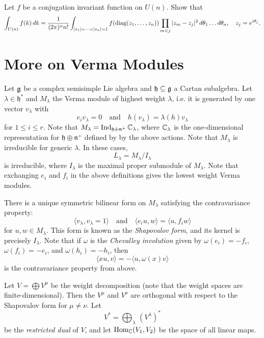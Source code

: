 \begin{exercise}
  Let $f$ be a conjugation invariant
  function on $U(n)$. Show that
  \[
    \int_{U(n)} f(k)\, dk
    = \frac{1}{(2\pi)^n n!}
    \int_{|z_1| = \cdots = |z_n| = 1}
    f(\operatorname{diag}(z_1, \dots, z_n))
    \prod_{m < j} |z_m - z_j|^2\, d\theta_1 \ldots d\theta_n,
    \quad z_j = e^{i \theta_j}.
  \]
\end{exercise}

\section{More on Verma Modules}

\begin{remark}
  Let $\mathfrak{g}$ be a complex semisimple Lie
  algebra and $\mathfrak{h} \subseteq \mathfrak{g}$ a Cartan
  subalgebra. Let $\lambda \in \mathfrak{h}^*$
  and $M_\lambda$ the Verma module of
  highest weight $\lambda$, i.e. it is
  generated by one vector $v_\lambda$ with
  \[
    e_i v_\lambda = 0 \quad \text{and} \quad
    h(v_\lambda) = \lambda(h) v_\lambda
  \]
  for $1 \le i \le r$. Note that
  $M_\lambda = \operatorname{Ind}_{\mathfrak{h} \oplus \mathfrak{n}^+} \mathbb{C}_\lambda$,
  where $\mathbb{C}_\lambda$ is the one-dimensional
  representation for
  $\mathfrak{h} \oplus \mathfrak{n}^+$
  defined by by the above actions.
  Note that $M_{\lambda}$ is irreducible
  for generic $\lambda$. In these
  cases,
  \[
    L_\lambda = M_\lambda / I_\lambda
  \]
  is irreducible, where $I_\lambda$ is
  the maximal proper submodule of
  $M_\lambda$. Note that exchanging
  $e_i$ and $f_i$ in the above definitions
  gives the lowest weight Verma modules.

  There is a unique symmetric bilinear
  form on $M_\lambda$ satisfying the
  contravariance property:
  \[
    \langle v_\lambda, v_\lambda = 1 \rangle
    \quad \text{and} \quad
    \langle e_i u, w \rangle 
    = \langle u, f_i w \rangle
  \]
  for $u, w \in M_\lambda$. This
  form is known as the \emph{Shapovalov form},
  and its kernel is precisely $I_\lambda$.
  Note that if $\omega$ is the
  \emph{Chevalley involution} given by
  $\omega(e_i) = -f_i$,
  $\omega(f_i) = -e_i$, and
  $\omega(h_i) = -h_i$, then
  \[
    \langle x u, v \rangle
    = - \langle u, \omega(x) v \rangle
  \]
  is the contravariance property from
  above.

  Let $V = \bigoplus V^\mu$ be the
  weight decomposition (note that the
  weight spaces are finite-dimensional).
  Then the $V^\mu$ and $V^\nu$ are
  orthogonal with respect to the
  Shapovalov form for $\mu \ne \nu$. Let
  \[
    V^* = \bigoplus_{\lambda}\, (V^\lambda)^*
  \]
  be the \emph{restricted dual} of $V$, and
  let $\operatorname{Hom}_{\mathbb{C}}(V_1, V_2)$ be the space
  of all linear maps.
\end{remark}

